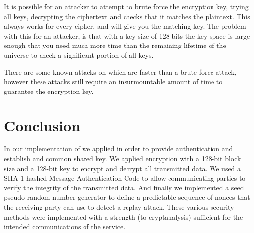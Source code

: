 \documentclass[a4paper,11pt]{article}
\begin{document}
It is possible for an attacker to attempt to brute force the encryption key,
trying all keys, decrypting the ciphertext and checks that it matches the
plaintext. This always works for every cipher, and will give you the matching
key. The problem with this for an attacker, is that with a key size of 128-bits
the key space is large enough that you need much more time than the remaining
lifetime of the universe to check a significant portion of all keys.

There are some known attacks on  which are faster than a brute
force attack, however these attacks still require an insurmountable amount of
time to guarantee the encryption key.

\section{Conclusion}
In our implementation of \packageName{} we applied  in order to provide authentication and establish and common shared
key. We applied  encryption with a 128-bit block size and a
128-bit key to encrypt and decrypt all transmitted data. We used a SHA-1
hashed Message Authentication Code to allow communicating parties to verify the
integrity of the transmitted data. And finally we implemented a seed pseudo-random
number generator to define a predictable sequence of nonces that the receiving
party can use to detect a replay attack. These various security methods were
implemented with a strength (to cryptanalysis) sufficient for the intended
communications of the \serviceName{} service.
\end{document}
